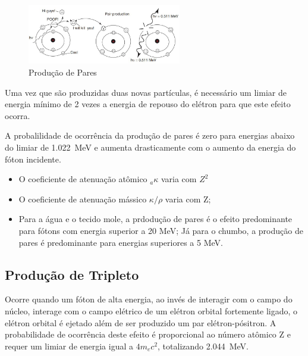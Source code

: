 \documentclass[11pt,a4paper]{article}
\begin{document}
                \begin{figure}[h]
                    \centering
                    \includegraphics[width=0.6\textwidth]{Imagens/producaoDePares.JPG}
                    \caption{Produção de Pares}
                    \label{fig:esquemaProducaoDePares}
                \end{figure}

                Uma vez que são produzidas duas novas partículas, é necessário um limiar de energia mínimo de 2 vezes a energia de repouso do elétron para que este efeito ocorra. 

                A probalilidade de ocorrência da produção de pares é zero para energias abaixo do limiar de \qty{1.022}{MeV} e aumenta drasticamente com o aumento da energia do fóton incidente. 

                \begin{itemize}
                    \item O coeficiente de atenuação atômico ${}_a\kappa$ varia com $Z^2$
                    \item O coeficiente de atenuação mássico $\kappa/\rho$ varia com Z;
                    \item Para a água e o tecido mole, a prdodução de pares é o efeito predominante para fótons com energia superior a 20 MeV; Já para o chumbo, a produção de pares é predominante para energias superiores a 5 MeV.
                \end{itemize}

        \subsection{Produção de Tripleto}

            Ocorre quando um fóton de alta energia, ao invés de interagir com o campo do núcleo, interage com o campo elétrico de um elétron orbital fortemente ligado, o elétron orbital é ejetado além de ser produzido um par elétron-pósitron. A probabilidade de ocorrência deste efeito é proporcional ao número atômico Z e requer um limiar de energia igual a $4 m_ec^2$, totalizando \qty{2.044}{MeV}. 
\end{document}
